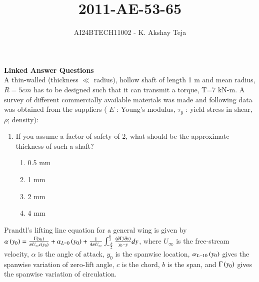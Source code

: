 \documentclass[journal,9pt,onecolumn]{IEEEtran}
\begin{document}

\vspace{3cm}
\title{2011-AE-53-65}
\author{AI24BTECH11002 - K. Akshay Teja}
\maketitle
 \bigskip
{\let\newpage\relax\maketitle}

\renewcommand{\thefigure}{\theenumi}
\renewcommand{\thetable}{\theenumi}
\setlength{\intextsep}{10pt} %

\renewcommand{\thetable}{\theenumi}


\noindent
\textbf{Linked Answer Questions}\\
A thin-walled (thickness $\ll$ radius), hollow shaft of length 1 m and mean radius, $R=5 cm$ has to be designed such that it can transmit a torque, T=7 kN-m. A survey of different commercially available materials was made and following data was obtained from the suppliers ( $E$ : Young's modulus, $\tau_y$ : yield stress in shear, $\rho$; density):\\
\begin{table}[h!]
    \centering
    
    \label{AE-2011}
\end{table}
\begin{enumerate}
\item If you assume a factor of safety of 2, what should be the approximate thickness of such a shaft?
   \begin{multicols}{4}
   \begin{enumerate}
       \item 0.5 mm
       \item 1 mm
       \item 2 mm
       \item 4 mm
   \end{enumerate}
   \end{multicols}
\end{enumerate} 
\noindent
Prandtl's lifting line equation for a general wing is given by \\
$\alpha\left(y_0\right)=\frac{\Gamma\left(y_0\right)}{\pi U_{\infty} c\left(y_0\right)}+\alpha_{L=0}\left(y_0\right)+\frac{1}{4 \pi U_{\infty}} \int_{-\frac{b}{2}}^{\frac{b}{2}} \frac{\left(\partial \Gamma / \partial y\right)}{y_0-y} d y$, 
where $U_{\infty}$ is the free-stream velocity, $\alpha$ is the angle of attack, $y_0$ is the spanwise location, $\alpha_{L-10}\left(y_0\right)$ gives the spanwise variation of zero-lift angle, $c$ is the chord, $b$ is the span, and $\Gamma\left(y_0\right)$ gives the spanwise variation of circulation.
\end{document}
